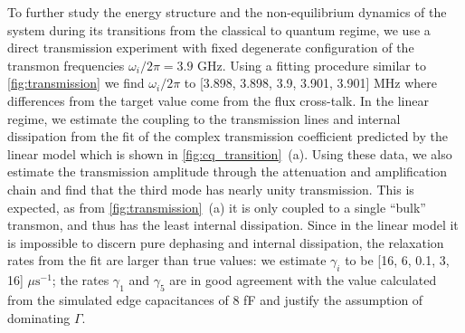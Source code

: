 \documentclass[%
 aps, prl,
 amsmath,amssymb,
 reprint,%
superscriptaddress
]{revtex4-2}
\begin{document}
To further study the energy structure and the non-equilibrium dynamics of the system during its transitions from the classical to quantum regime, we use a direct transmission experiment with fixed degenerate configuration of the transmon frequencies $\omega_i/2\pi = 3.9$ GHz. Using a fitting procedure similar to \autoref{fig:transmission} we find $\omega_i/2\pi$ to [3.898, 3.898, 3.9, 3.901, 3.901] MHz where differences from the target value come from the flux cross-talk. In the linear regime, we estimate the coupling to the transmission lines and internal dissipation from the fit of the complex transmission coefficient predicted by the linear model which is shown in \autoref{fig:cq_transition}~(a). Using these data, we also estimate the transmission amplitude through the attenuation and amplification chain and find that the third mode has nearly unity transmission. This is expected, as from \autoref{fig:transmission}~(a) it is only coupled to a single ``bulk'' transmon, and thus has the least internal dissipation. Since in the linear model it is impossible to discern pure dephasing and internal dissipation, the relaxation rates from the fit are larger than true values: we estimate $\gamma_i$ to be [16, 6, 0.1,  3, 16] $\mu\text{s}^{-1}$; the rates $\gamma_1$ and $\gamma_5$ are in good agreement with the value calculated from the simulated edge capacitances of 8 fF and justify the assumption of dominating $\Gamma$.
\end{document}
